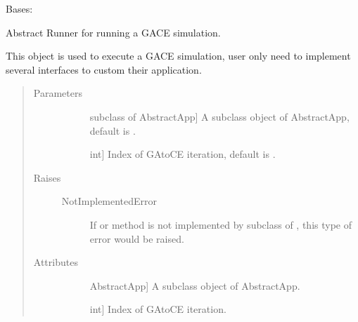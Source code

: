 \documentclass[letterpaper,10pt,english]{sphinxmanual}
\begin{document}
\begin{fulllineitems}
\label{\detokenize{pygace:pygace.gace.AbstractRunner}}
\sphinxAtStartPar
Bases: 

\sphinxAtStartPar
Abstract Runner for running a GACE simulation.

\sphinxAtStartPar
This object is used to execute a GACE simulation, user only need to
implement several interfaces to custom their application.
\begin{quote}\begin{description}
\item[{Parameters}] \leavevmode\begin{description}
\item[{}] \leavevmode{[}subclass of AbstractApp{]}
\sphinxAtStartPar
A subclass object of AbstractApp, default is .

\item[{}] \leavevmode{[}int{]}
\sphinxAtStartPar
Index of GA\sphinxhyphen{}to\sphinxhyphen{}CE iteration, default is .

\end{description}

\item[{Raises}] \leavevmode\begin{description}
\item[{NotImplementedError}] \leavevmode
\sphinxAtStartPar
If  or  method is not implemented by subclass of
, this type of error would be raised.

\end{description}

\item[{Attributes}] \leavevmode\begin{description}
\item[{}] \leavevmode{[}AbstractApp{]}
\sphinxAtStartPar
A subclass object of AbstractApp.

\item[{}] \leavevmode{[}int{]}
\sphinxAtStartPar
Index of GA\sphinxhyphen{}to\sphinxhyphen{}CE iteration.


\end{description}
\end{description}
\end{quote}
\end{fulllineitems}
\end{document}
